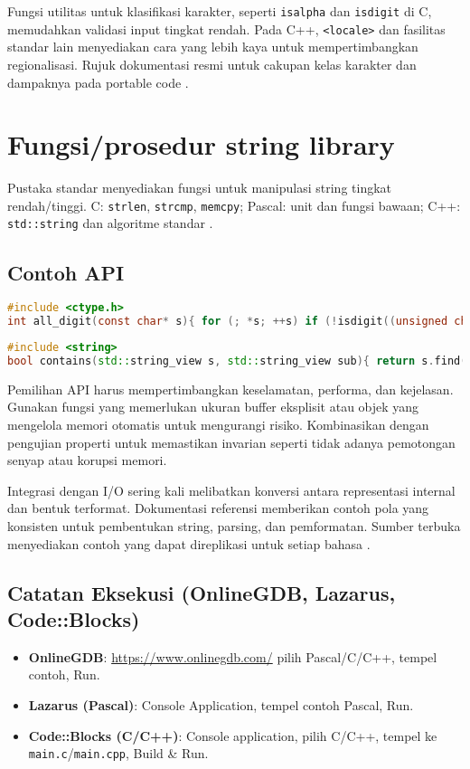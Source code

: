 \documentclass[../main.tex]{subfiles}
\begin{document}
Fungsi utilitas untuk klasifikasi karakter, seperti \texttt{isalpha} dan \texttt{isdigit} di C, memudahkan validasi input tingkat rendah. Pada C++, \texttt{<locale>} dan fasilitas standar lain menyediakan cara yang lebih kaya untuk mempertimbangkan regionalisasi. Rujuk dokumentasi resmi untuk cakupan kelas karakter dan dampaknya pada portable code \parencite{iso-c-draft-n1570,cpp-reference}.

\section{Fungsi/prosedur string library}
Pustaka standar menyediakan fungsi untuk manipulasi string tingkat rendah/tinggi. C: \texttt{strlen}, \texttt{strcmp}, \texttt{memcpy}; Pascal: unit dan fungsi bawaan; C++: \texttt{std::string} dan algoritme standar \parencite{c-strings-h,free-pascal-docs,cpp-strings}.

\subsection{Contoh API}
\begin{lstlisting}[language=C, caption={Validasi digit dengan <ctype.h>}]
#include <ctype.h>
int all_digit(const char* s){ for (; *s; ++s) if (!isdigit((unsigned char)*s)) return 0; return 1; }
\end{lstlisting}

\begin{lstlisting}[language=C++, caption={Mencari substring di C++}]
#include <string>
bool contains(std::string_view s, std::string_view sub){ return s.find(sub) != std::string::npos; }
\end{lstlisting}

Pemilihan API harus mempertimbangkan keselamatan, performa, dan kejelasan. Gunakan fungsi yang memerlukan ukuran buffer eksplisit atau objek yang mengelola memori otomatis untuk mengurangi risiko. Kombinasikan dengan pengujian properti untuk memastikan invarian seperti tidak adanya pemotongan senyap atau korupsi memori.

Integrasi dengan I/O sering kali melibatkan konversi antara representasi internal dan bentuk terformat. Dokumentasi referensi memberikan contoh pola yang konsisten untuk pembentukan string, parsing, dan pemformatan. Sumber terbuka menyediakan contoh yang dapat direplikasi untuk setiap bahasa \parencite{c-strings-h,cpp-strings,free-pascal-docs}.
\subsection{Catatan Eksekusi (OnlineGDB, Lazarus, Code::Blocks)}
\begin{itemize}
  \item \textbf{OnlineGDB}: \url{https://www.onlinegdb.com/} \textrightarrow{} pilih Pascal/C/C++, tempel contoh, Run.
  \item \textbf{Lazarus (Pascal)}: Console Application, tempel contoh Pascal, Run.
  \item \textbf{Code::Blocks (C/C++)}: Console application, pilih C/C++, tempel ke \texttt{main.c}/\texttt{main.cpp}, Build \& Run.
\end{itemize}
\end{document}
